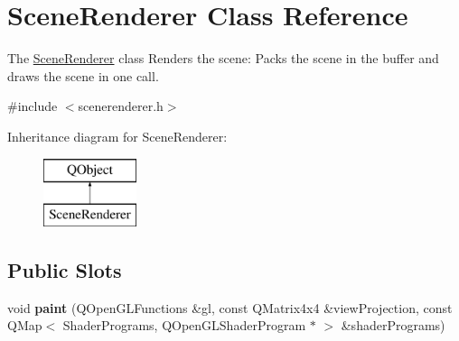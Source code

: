 \hypertarget{class_scene_renderer}{}\section{Scene\+Renderer Class Reference}
\label{class_scene_renderer}


The \hyperlink{class_scene_renderer}{Scene\+Renderer} class  Renders the scene\+: Packs the scene in the buffer and draws the scene in one call.  




{\ttfamily \#include $<$scenerenderer.\+h$>$}

Inheritance diagram for Scene\+Renderer\+:\begin{figure}[H]
\begin{center}
\leavevmode
\includegraphics[height=2.000000cm]{class_scene_renderer}
\end{center}
\end{figure}
\subsection*{Public Slots}
\begin{DoxyCompactItemize}
\item 
\hypertarget{class_scene_renderer_a0b6e4d40b218acb45ea13bb4fda494e5}{}void {\bfseries paint} (Q\+Open\+G\+L\+Functions \&gl, const Q\+Matrix4x4 \&view\+Projection, const Q\+Map$<$ Shader\+Programs, Q\+Open\+G\+L\+Shader\+Program $\ast$ $>$ \&shader\+Programs)\label{class_scene_renderer_a0b6e4d40b218acb45ea13bb4fda494e5}

\end{DoxyCompactItemize}
